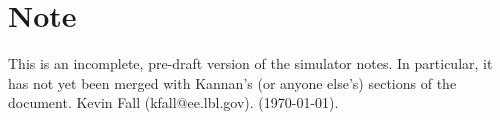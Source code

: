 \documentclass{article}
\begin{document}
\section*{Note}
This is an incomplete, pre-draft version of the simulator
notes.
In particular, it has not yet been merged with Kannan's
(or anyone else's)
sections of the document.  Kevin Fall (kfall@ee.lbl.gov).
(\today).








\end{document}
